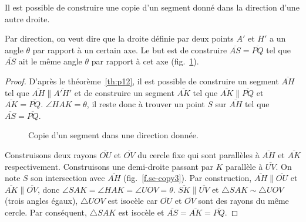 \begin{theorem}\label{thm.straight-direction}
Il est possible de construire une copie d'un segment  donné dans la direction d'une autre droite.
\end{theorem}

Par \og direction\fg{}, on veut dire  que la droite définie par deux points $A'$ et $H'$ a un angle $\theta$ par rapport à un certain axe. Le but est de construire $\overline{AS}=\overline{PQ}$ tel que $\overline{AS}$ ait le même angle $\theta$ par rapport à cet axe  (fig.~\ref{f.se-copy1}).

\begin{proof}
D'après le théorème~\ref{th:p12}, il est possible de construire un segment  $\overline{AH}$ tel que $\overline{AH}\parallel\overline{A'H'}$ et de construire un segment  $\overline{AK}$ tel que $\overline{AK}\parallel\overline{PQ}$ et $\overline{AK}=\overline{PQ}$.
$\angle HAK=\theta$, il reste donc à trouver un point $S$ sur $\overline{AH}$ tel que $\overline{AS}=\overline{PQ}$.

\begin{figure}[htbp]
\centering  
{}
\caption{Copie d'un segment dans une direction donnée.}\label{f.se-copy1}
\end{figure}

Construisons deux rayons $\overline{OU}$ et $\overline{OV}$ du cercle fixe qui sont parallèles à $\overline{AH}$ et $\overline{AK}$ respectivement. Construisons une demi-droite passant par $K$ parallèle à $\overline{UV}$. On note $S$ son intersection avec $\overline{AH}$ (fig.~\ref{f.se-copy3}). Par construction, $\overline{AH}\parallel\overline{OU}$ et $\overline{AK}\parallel\overline{OV}$, donc $\angle SAK=\angle HAK=\angle UOV=\theta$.  $\overline{SK}\parallel\overline{UV}$ et $\triangle SAK\sim\triangle UOV$ (trois angles égaux), $\triangle UOV$ est isocèle car $\overline{OU}$ et $\overline{OV}$ sont des rayons du même cercle. Par conséquent, $\triangle SAK$ est isocèle et 
$\overline{AS}=\overline{AK}=\overline{PQ}$.
\end{proof}

